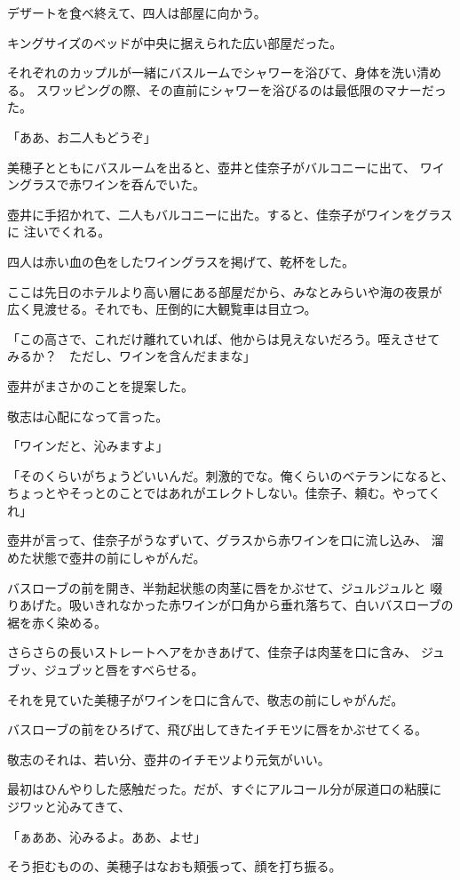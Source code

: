 ﻿\documentclass[
    book,tate,
    line_length=30zw,
    jafontsize=12pt,
    paper=b5j,
    landscape,
    ]{jlreq}
\begin{document}
デザートを食べ終えて、四人は部屋に向かう。

キングサイズのベッドが中央に据えられた広い部屋だった。

それぞれのカップルが一緒にバスルームでシャワーを浴びて、身体を洗い清める。
スワッピングの際、その直前にシャワーを浴びるのは最低限のマナーだった。

「ああ、お二人もどうぞ」

美穂子とともにバスルームを出ると、壺井と佳奈子がバルコニーに出て、
ワイングラスで赤ワインを呑んでいた。

壺井に手招かれて、二人もバルコニーに出た。すると、佳奈子がワインをグラスに
注いでくれる。

四人は赤い血の色をしたワイングラスを掲げて、乾杯をした。

ここは先日のホテルより高い層にある部屋だから、みなとみらいや海の夜景が
広く見渡せる。それでも、圧倒的に大観覧車は目立つ。

「この高さで、これだけ離れていれば、他からは見えないだろう。咥えさせて
みるか？　ただし、ワインを含んだままな」

壺井がまさかのことを提案した。

敬志は心配になって言った。

「ワインだと、沁みますよ」

「そのくらいがちょうどいいんだ。刺激的でな。俺くらいのベテランになると、
ちょっとやそっとのことではあれがエレクトしない。佳奈子、頼む。やってくれ」

壺井が言って、佳奈子がうなずいて、グラスから赤ワインを口に流し込み、
溜めた状態で壺井の前にしゃがんだ。

バスローブの前を開き、半勃起状態の肉茎に唇をかぶせて、ジュルジュルと
啜りあげた。吸いきれなかった赤ワインが口角から垂れ落ちて、白いバスローブの
裾を赤く染める。

さらさらの長いストレートヘアをかきあげて、佳奈子は肉茎を口に含み、
ジュブッ、ジュブッと唇をすべらせる。

それを見ていた美穂子がワインを口に含んで、敬志の前にしゃがんだ。

バスローブの前をひろげて、飛び出してきたイチモツに唇をかぶせてくる。

敬志のそれは、若い分、壺井のイチモツより元気がいい。

最初はひんやりした感触だった。だが、すぐにアルコール分が尿道口の粘膜に
ジワッと沁みてきて、

「ぁああ、沁みるよ。ああ、よせ」

そう拒むものの、美穂子はなおも頬張って、顔を打ち振る。
\end{document}
